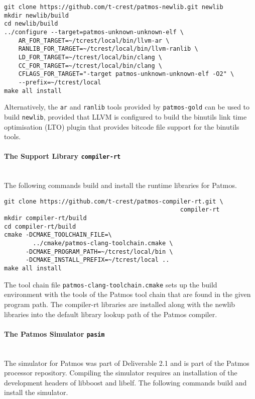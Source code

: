 \begin{verbatim}
git clone https://github.com/t-crest/patmos-newlib.git newlib
mkdir newlib/build
cd newlib/build
../configure --target=patmos-unknown-unknown-elf \
    AR_FOR_TARGET=~/tcrest/local/bin/llvm-ar \
    RANLIB_FOR_TARGET=~/tcrest/local/bin/llvm-ranlib \
    LD_FOR_TARGET=~/tcrest/local/bin/clang \
    CC_FOR_TARGET=~/tcrest/local/bin/clang \
    CFLAGS_FOR_TARGET="-target patmos-unknown-unknown-elf -O2" \
    --prefix=~/tcrest/local
make all install
\end{verbatim}

Alternatively, the \texttt{ar} and \texttt{ranlib} tools provided by \texttt{patmos-gold} can 
be used to build \texttt{newlib}, provided that LLVM is configured to build the binutils link time optimisation (LTO) plugin that provides
bitcode file support for the binutils tools.
\paragraph{The Support Library \texttt{compiler-rt}} \hfill \\

The following commands build and install the runtime libraries for Patmos.

\begin{verbatim}
git clone https://github.com/t-crest/patmos-compiler-rt.git \
                                                 compiler-rt
mkdir compiler-rt/build
cd compiler-rt/build
cmake -DCMAKE_TOOLCHAIN_FILE=\
        ../cmake/patmos-clang-toolchain.cmake \
      -DCMAKE_PROGRAM_PATH=~/tcrest/local/bin \
      -DCMAKE_INSTALL_PREFIX=~/tcrest/local ..
make all install
\end{verbatim}

The tool chain file \texttt{patmos-clang-toolchain.cmake} sets up the build environment with the tools of the Patmos tool chain 
that are found in the given program path. The compiler-rt libraries are installed
along with the newlib libraries into the default library lookup path
of the Patmos compiler.

\paragraph{The Patmos Simulator \texttt{pasim}} \hfill \\

The simulator for Patmos was part of Deliverable 2.1 and is part of the Patmos processor repository. Compiling the simulator requires an installation of the 
development headers of libboost and libelf. The following commands build and install the simulator.

